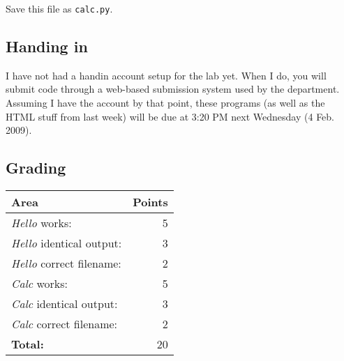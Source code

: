 \documentclass[11pt, letterpaper]{article}
\begin{document}
Save this file as {\tt calc.py}.

\subsection*{Handing in}

I have not had a handin account setup for the lab yet. When I do, you will submit code through a web-based submission system used by the department. Assuming I have the account by that point, these programs (as well as the HTML stuff from last week) will be due at 3:20 PM next Wednesday (4 Feb. 2009).

\subsection*{Grading}

\begin{tabular}{lr}
	Area & Points\\
	\hline
	{\em Hello} works: & 5\\
	{\em Hello} identical output: & 3\\
	{\em Hello} correct filename: & 2\\
	{\em Calc} works: & 5\\
	{\em Calc} identical output: & 3\\
	{\em Calc} correct filename: & 2\\
	{\bf Total:} & 20
\end{tabular}
\end{document}
